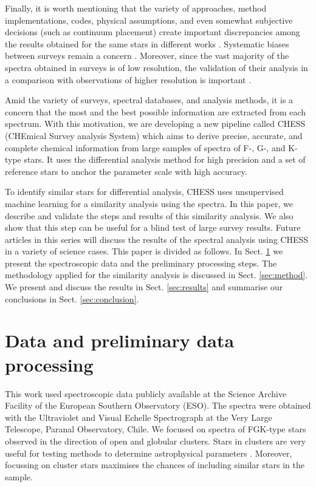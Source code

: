 \documentclass{aa}
\begin{document}
Finally, it is worth mentioning that the variety of approaches, method implementations, codes, physical assumptions, and even somewhat subjective decisions (such as continuum placement) create important discrepancies among the results obtained for the same stars in different works \citep{Lebzelter2012, Smiljanic2014, Hinkel2016, Jofre2017, Jonsson2018, Brucalassi2022b}. Systematic biases between surveys remain a concern \citep[see e.g.][]{Soubiran2022, Hegedus2023, VanderSwaelmen2024}. Moreover, since the vast majority of the spectra obtained in surveys is of low resolution, the validation of their analysis in a comparison with observations of higher resolution is important \citep{Karinkuzhi2021, Sandford2023}.

Amid the variety of surveys, spectral databases, and analysis methods, it is a concern that the most and the best possible information are extracted from each spectrum. With this motivation, we are developing a new pipeline called {\sf CHESS} (CHEmical Survey analysis System) which aims to derive precise, accurate, and complete chemical information from large samples of spectra of F-, G-, and K-type stars. It uses the differential analysis method for high precision and a set of reference stars to anchor the parameter scale with high accuracy. 

To identify similar stars for differential analysis, {\sf CHESS} uses unsupervised machine learning for a similarity analysis using the spectra. In this paper, we describe and validate the steps and results of this similarity analysis. We also show that this step can be useful for a blind test of large survey results. Future articles in this series will discuss the results of the spectral analysis using {\sf CHESS} in a variety of science cases. This paper is divided as follows. In Sect. \ref{sec:data} we present the spectroscopic data and the preliminary processing steps. The methodology applied for the similarity analysis is discussed in Sect. \ref{sec:method}. We present and discuss the results in Sect. \ref{sec:results} and summarise our conclusions in Sect. \ref{sec:conclusion}.


\section{Data and preliminary data processing}\label{sec:data}

This work used spectroscopic data publicly available at the Science Archive Facility \citep[SAF,][]{Romaniello2023} of the European Southern Observatory (ESO). The spectra were obtained with the Ultraviolet and Visual Echelle Spectrograph \citep[UVES,][]{UVES} at the Very Large Telescope, Paranal Observatory, Chile. We focused on spectra of FGK-type stars observed in the direction of open and globular clusters. Stars in clusters are very useful for testing methods to determine astrophysical parameters \citep[e.g.][]{Holtzman2015, Pancino2017, Anders2022}. Moreover, focussing on cluster stars maximises the chances of including similar stars in the sample. 
\end{document}
